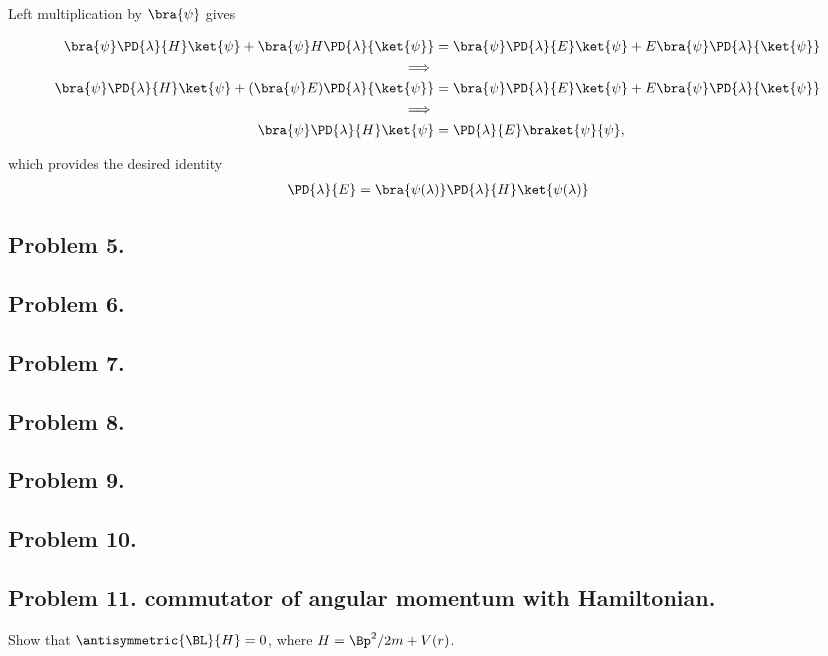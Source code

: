 Left multiplication by $\bra{\psi}$ gives

\begin{align*}
\bra{\psi}\PD{\lambda}{H} \ket{\psi} +\bra{\psi}H \PD{\lambda}{\ket{\psi}} &= \bra{\psi}\PD{\lambda}{E} \ket{\psi} +  E \bra{\psi}\PD{\lambda}{\ket{\psi} } \\
\implies \\
\bra{\psi}\PD{\lambda}{H} \ket{\psi} +(\bra{\psi}E) \PD{\lambda}{\ket{\psi}} &= \bra{\psi}\PD{\lambda}{E} \ket{\psi} +  E \bra{\psi}\PD{\lambda}{\ket{\psi} } \\
\implies \\
\bra{\psi}\PD{\lambda}{H} \ket{\psi} &= \PD{\lambda}{E} \braket{\psi}{\psi},
\end{align*}

which provides the desired identity
\begin{align}\label{eqn:desaiCh3:4}
\PD{\lambda}{E} 
= \bra{\psi(\lambda)}\PD{\lambda}{H} \ket{\psi(\lambda)}
\end{align}

\subsection{Problem 5. }
\subsection{Problem 6. }
\subsection{Problem 7. }
\subsection{Problem 8. }
\subsection{Problem 9. }
\subsection{Problem 10. }
\subsection{Problem 11. commutator of angular momentum with Hamiltonian.}

Show that $\antisymmetric{\BL}{H} = 0$, where $H = \Bp^2/2m + V(r)$.

